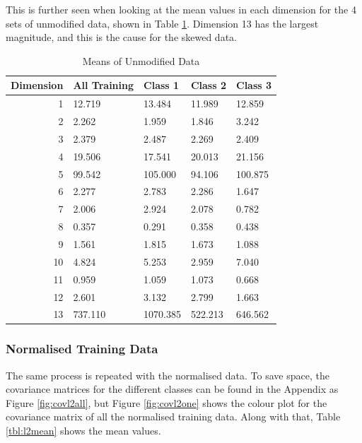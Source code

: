 \documentclass[a4paper, 10pt, conference]{ieeeconf}
\begin{document}
This is further seen when looking at the mean values in each dimension for the 4 sets of unmodified data, shown in Table \ref{tbl:trainingmean}. Dimension 13 has the largest magnitude, and this is the cause for the skewed data.

\begin{table}[!ht]
\centering
\caption{Means of Unmodified Data}
\label{tbl:trainingmean}
\begin{tabular}{|r|llll|}
\hline
\textbf{Dimension} & \textbf{All Training} & \textbf{Class 1} & \textbf{Class 2} & \textbf{Class 3} \\ \hline
1 & 12.719 & 13.484 & 11.989 & 12.859\\
2 & 2.262 & 1.959 & 1.846 & 3.242\\
3 & 2.379 & 2.487 & 2.269 & 2.409\\
4 & 19.506 & 17.541 & 20.013 & 21.156\\
5 & 99.542 & 105.000 & 94.106 & 100.875\\
6 & 2.277 & 2.783 & 2.286 & 1.647\\
7 & 2.006 & 2.924 & 2.078 & 0.782\\
8 & 0.357 & 0.291 & 0.358 & 0.438\\
9 & 1.561 & 1.815 & 1.673 & 1.088\\
10 & 4.824 & 5.253 & 2.959 & 7.040\\
11 & 0.959 & 1.059 & 1.073 & 0.668\\
12 & 2.601 & 3.132 & 2.799 & 1.663\\
13 & 737.110 & 1070.385 & 522.213 & 646.562\\ \hline
\end{tabular}
\end{table}

\subsubsection{Normalised Training Data}
The same process is repeated with the normalised data. To save space, the covariance matrices for the different classes can be found in the Appendix as Figure \ref{fig:covl2all}, but Figure \ref{fig:covl2one} shows the colour plot for the covariance matrix of all the normalised training data. Along with that, Table \ref{tbl:l2mean} shows the mean values.
\end{document}
